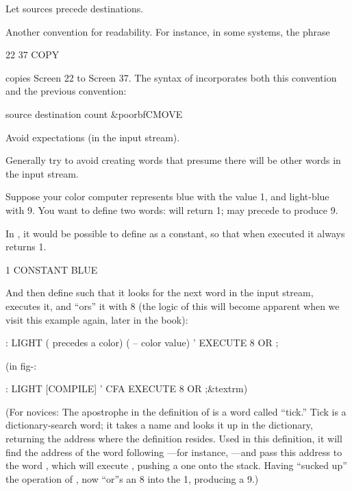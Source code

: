 \begin{tip}
Let sources precede destinations.
\end{tip}
Another convention for readability. For instance, in some systems, the
phrase
\begin{Code}
22 37 COPY
\end{Code}
copies Screen 22 to Screen 37. The syntax of  incorporates both
this convention and the previous convention:
\begin{Code}[commandchars=\&\{\}]
source destination count &poorbf{CMOVE}
\end{Code}

\begin{tip}
Avoid expectations (in the input stream).
\end{tip}
Generally try to avoid creating words that presume there will be other
words in the input stream.

Suppose your color computer represents blue with the value 1, and
light-blue with 9. You want to define two words:  will return
1;  may precede  to produce 9.

In \Forth{}, it would be possible to define  as a constant, so
that when executed it always returns 1.\label{color1}

\begin{Code}
1 CONSTANT BLUE
\end{Code}
And then define  such that it looks for the next word in the
input stream, executes it, and ``ors'' it with 8 (the logic of this will
become apparent when we visit this example again, later in the book):
\begin{Code}
: LIGHT  ( precedes a color)  ( -- color value)
     ' EXECUTE  8 OR ;
\end{Code}
(in fig-\Forth{}:
\begin{Code}[commandchars=\&\{\}]
: LIGHT [COMPILE] '  CFA EXECUTE  8 OR ;&textrm{)}
\end{Code}
\noindent (For novices: The apostrophe in the definition of 
is a \Forth{} word called ``tick.'' Tick is a dictionary-search word; it
takes a name and looks it up in the dictionary, returning the address
where the definition resides. Used in this definition, it will find the
address of the word following ---for instance,
---and pass this address to the word , which
will execute , pushing a one onto the stack.  Having ``sucked
up'' the operation of ,  now ``or''s an 8 into
the 1, producing a 9.)

